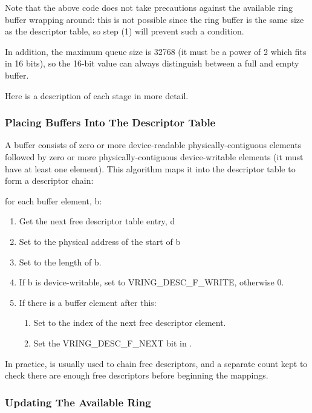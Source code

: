 Note that the above code does not take precautions against the
available ring buffer wrapping around: this is not possible since
the ring buffer is the same size as the descriptor table, so step
(1) will prevent such a condition.

In addition, the maximum queue size is 32768 (it must be a power
of 2 which fits in 16 bits), so the 16-bit  value can always
distinguish between a full and empty buffer.

Here is a description of each stage in more detail.

\subsubsection{Placing Buffers Into The Descriptor Table}\label{sec:General Initialization And Device Operation / Device Operation / Supplying Buffers to The Device / Placing Buffers Into The Descriptor Table}

A buffer consists of zero or more device-readable physically-contiguous
elements followed by zero or more physically-contiguous
device-writable elements (it must have at least one element). This
algorithm maps it into the descriptor table to form a descriptor
chain:

for each buffer element, b:

\begin{enumerate}
\item Get the next free descriptor table entry, d
\item Set  to the physical address of the start of b
\item Set  to the length of b.
\item If b is device-writable, set  to VRING_DESC_F_WRITE,
    otherwise 0.
\item If there is a buffer element after this:
    \begin{enumerate}
    \item Set  to the index of the next free descriptor
      element.
    \item Set the VRING_DESC_F_NEXT bit in .
    \end{enumerate}
\end{enumerate}

In practice,  is usually used to chain free
descriptors, and a separate count kept to check there are enough
free descriptors before beginning the mappings.

\subsubsection{Updating The Available Ring}\label{sec:General Initialization And Device Operation / Device Operation / Supplying Buffers to The Device / Updating The Available Ring}

